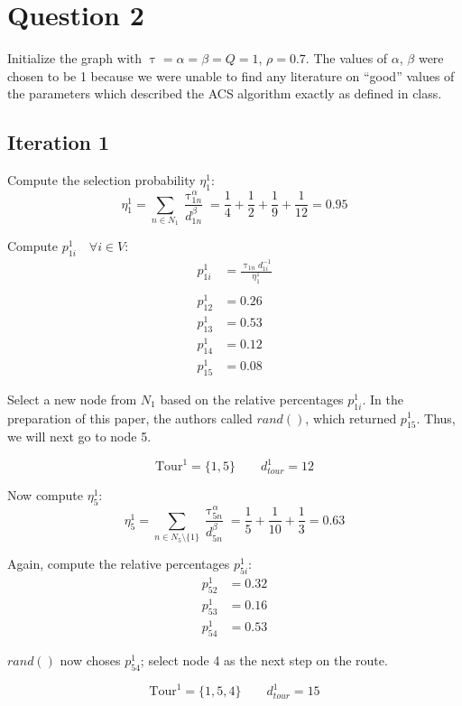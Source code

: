 \documentclass[a4paper]{article}
\begin{document}
\section{Question 2}

Initialize the graph with $\uptau = \alpha = \beta = Q = 1$, $\rho = 0.7$. The values of $\alpha$, $\beta$ were chosen to be 1 because we were unable to find any literature on ``good'' values of the parameters which described the ACS algorithm exactly as defined in class.

\subsection{Iteration 1}

Compute the selection probability $\eta_1^1$:
$$
\eta_1^1 = \sum_{n \in N_1} \frac{\uptau_{1n}^\alpha}{d_{1n}^\beta} = \frac{1}{4} + \frac{1}{2} + \frac{1}{9} + \frac{1}{12} = 0.95
$$

Compute $p_{1i}^1 \quad \forall i \in V$:
\begin{align*}
p_{1i}^1 &= \frac{\uptau_{1n}d_{1i}^{-1}}{\eta_1^1} \\
\\
p_{12}^1 &= 0.26 \\
p_{13}^1 &= 0.53 \\
p_{14}^1 &= 0.12 \\
p_{15}^1 &= 0.08
\end{align*}

Select a new node from $N_1$ based on the relative percentages $p_{1i}^1$. In the preparation of this paper, the authors called $rand()$, which returned $p_{15}^1$. Thus, we will next go to node 5.

$$
\text{Tour}^1 = \{1, 5\} \qquad
d_{tour}^1 = 12
$$

Now compute $\eta_5^1$:
$$
\eta_5^1 = \sum_{n \in N_5 \setminus \{1\}} \frac{\uptau_{5n}^\alpha}{d_{5n}^\beta} = \frac{1}{5} + \frac{1}{10} + \frac{1}{3} = 0.63
$$

Again, compute the relative percentages $p_{5i}^1$:
\begin{align*}
p_{52}^1 &= 0.32 \\
p_{53}^1 &= 0.16 \\
p_{54}^1 &= 0.53
\end{align*}

$rand()$ now choses $p_{54}^1$; select node 4 as the next step on the route.

$$
\text{Tour}^1 = \{1, 5, 4\} \qquad
d_{tour}^1 = 15
$$
\end{document}
